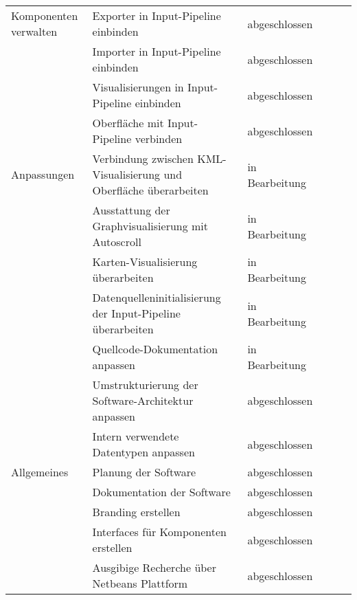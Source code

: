 \begin{table}[H]
\begin{tabular}{p{3cm}p{7cm}p{3cm}rrr}
	\midrule
	Komponenten verwalten & Exporter in Input-Pipeline einbinden & abgeschlossen \\
	& Importer in Input-Pipeline einbinden & abgeschlossen \\
	& Visualisierungen in Input-Pipeline einbinden & abgeschlossen \\
	& Oberfläche mit Input-Pipeline verbinden & abgeschlossen \\
	\midrule
	Anpassungen & Verbindung zwischen KML-Visualisierung und Oberfläche überarbeiten & in Bearbeitung \\
	& Ausstattung der Graphvisualisierung mit Autoscroll & in Bearbeitung \\
	& Karten-Visualisierung überarbeiten & in Bearbeitung \\
	& Datenquelleninitialisierung der Input-Pipeline überarbeiten & in Bearbeitung \\
	& Quellcode-Dokumentation anpassen & in Bearbeitung \\
	& Umstrukturierung der Software-Architektur anpassen & abgeschlossen \\
	& Intern verwendete Datentypen anpassen & abgeschlossen \\
	\midrule
	Allgemeines & Planung der Software & abgeschlossen \\
	& Dokumentation der Software & abgeschlossen \\
    & Branding erstellen & abgeschlossen \\
    & Interfaces für Komponenten erstellen & abgeschlossen \\
    & Ausgibige Recherche über Netbeans Plattform & abgeschlossen \\
 \end{tabular}
 \end{table}
